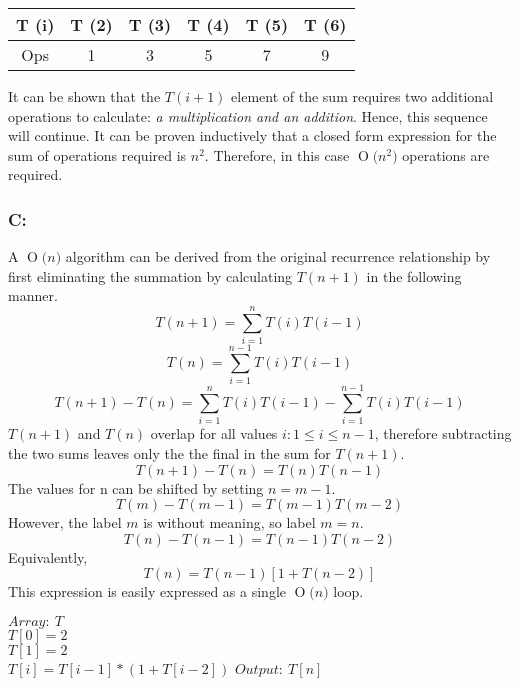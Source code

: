 \documentclass[12pt]{article}
\newcommand{\BigO}[1]{\ensuremath{\operatorname{O}\bigl(#1\bigr)}}
\begin{document}
\begin{center}
    \begin{tabular}{c| c c c c c}
    T (i) & T (2) & T (3) & T (4) & T (5) & T (6) \\ \hline  
    Ops & 1 & 3 & 5 & 7 & 9 \\
    \end{tabular}
\end{center}
It can be shown that the $T(i+1)$ element of the sum requires two additional
operations to calculate: \textit{a multiplication and an addition}.  Hence,
this sequence will continue.  It can be proven inductively that a closed
form expression for the sum of operations required is $n^2$.  Therefore,
in this case \BigO{n^2} operations are required. 

\subsubsection*{C:}
A \BigO{n} algorithm can be derived from the original recurrence
relationship by first eliminating the summation by calculating
$T(n+1)$ in the following manner.
\[
T(n+1) = \sum_{i=1}^{n}T(i)T(i-1)
\]
\[
T(n) = \sum_{i=1}^{n-1}T(i)T(i-1)
\]
\[
T(n+1) - T(n) = \sum_{i=1}^{n}T(i)T(i-1) - \sum_{i=1}^{n-1}T(i)T(i-1)  
\]
$T(n+1)$ and $T(n)$ overlap for all values $i:1\leq i\leq n-1$, therefore
subtracting the two sums leaves only the the final in the sum for $T(n+1)$.
\[
T(n+1) - T(n) = T(n)T(n-1)
\] 
The values for n can be shifted by setting $n = m-1$.
\[
T(m) - T(m-1) = T(m-1)T(m-2)
\]
However, the label $m$ is without meaning, so label $m=n$.
\[
T(n) - T(n-1) = T(n-1)T(n-2)
\]
Equivalently,
\[
T(n) = T(n-1)[1+T(n-2)]
\]
This expression is easily expressed as a single \BigO{n} loop.\\
\begin{algorithm}[H]
$Array:\ T$\\
$T[0] = 2$\\
$T[1] = 2$\\
{$T[i] = T[i-1]*(1+T[i-2])$}
$Output:\ T[n]$

\end{algorithm}
\end{document}
